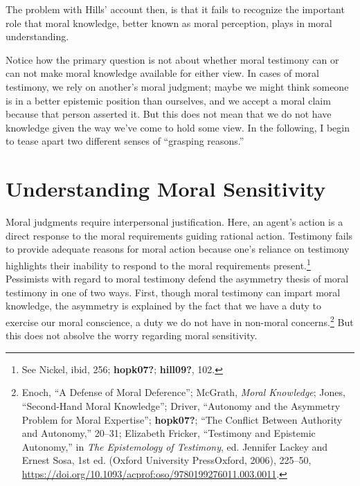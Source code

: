 \documentclass[
  12pt,
]{book}
\theoremstyle{definition}
\theoremstyle{definition}
\theoremstyle{definition}
\theoremstyle{definition}
\theoremstyle{remark}
\begin{document}
The problem with Hills' account then, is that it fails to recognize the important role that moral knowledge, better known as moral perception, plays in moral understanding.

Notice how the primary question is not about whether moral testimony can or can not make moral knowledge available for either view. In cases of moral testimony, we rely on another's moral judgment; maybe we might think someone is in a better epistemic position than ourselves, and we accept a moral claim because that person asserted it. But this does not mean that we do not have knowledge given the way we've come to hold some view. In the following, I begin to tease apart two different senses of ``grasping reasons.''

\section{Understanding Moral Sensitivity}\label{understanding-moral-sensitivity}

Moral judgments require interpersonal justification. Here, an agent's action is a direct response to the moral requirements guiding rational action. Testimony fails to provide adequate reasons for moral action because one's reliance on testimony highlights their inability to respond to the moral requirements present.\footnote{See Nickel, ibid, 256; \textbf{hopk07?}; \textbf{hill09?}, 102.} Pessimists with regard to moral testimony defend the asymmetry thesis of moral testimony in one of two ways. First, though moral testimony can impart moral knowledge, the asymmetry is explained by the fact that we have a duty to exercise our moral conscience, a duty we do not have in non-moral concerns.\footnote{Enoch, {``A {Defense} of {Moral Deference}''}; McGrath, \emph{Moral {Knowledge}}; Jones, {``Second-{Hand Moral Knowledge}''}; Driver, {``Autonomy and the {Asymmetry Problem} for {Moral Expertise}''}; \textbf{hopk07?}; {``The {Conflict Between Authority} and {Autonomy},''} 20--31; Elizabeth Fricker, {``Testimony and {Epistemic Autonomy},''} in \emph{The {Epistemology} of {Testimony}}, ed. Jennifer Lackey and Ernest Sosa, 1st ed. (Oxford University PressOxford, 2006), 225--50, \url{https://doi.org/10.1093/acprof:oso/9780199276011.003.0011}.} But this does not absolve the worry regarding moral sensitivity.
\end{document}
